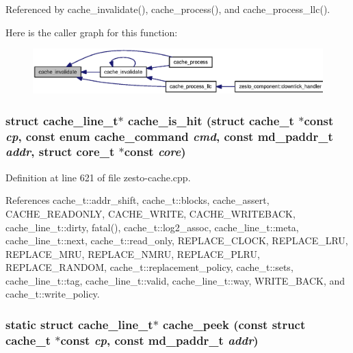 Referenced by cache\_\-invalidate(), cache\_\-process(), and cache\_\-process\_\-llc().

Here is the caller graph for this function:\nopagebreak
\begin{figure}[H]
\begin{center}
\leavevmode
\includegraphics[width=420pt]{zesto-cache_8cpp_3b38a26dd8bf1670d4bf3055d66cfc8d_icgraph}
\end{center}
\end{figure}
\subsubsection[{cache\_\-is\_\-hit}]{\setlength{\rightskip}{0pt plus 5cm}struct {\bf cache\_\-line\_\-t}$\ast$ cache\_\-is\_\-hit (struct {\bf cache\_\-t} $\ast$const  {\em cp}, \/  const enum {\bf cache\_\-command} {\em cmd}, \/  const {\bf md\_\-paddr\_\-t} {\em addr}, \/  struct {\bf core\_\-t} $\ast$const  {\em core})\hspace{0.3cm}{\tt  [read]}}\label{zesto-cache_8cpp_bbba2e5ba6186173122bcf1e35dc56eb}




Definition at line 621 of file zesto-cache.cpp.

References cache\_\-t::addr\_\-shift, cache\_\-t::blocks, cache\_\-assert, CACHE\_\-READONLY, CACHE\_\-WRITE, CACHE\_\-WRITEBACK, cache\_\-line\_\-t::dirty, fatal(), cache\_\-t::log2\_\-assoc, cache\_\-line\_\-t::meta, cache\_\-line\_\-t::next, cache\_\-t::read\_\-only, REPLACE\_\-CLOCK, REPLACE\_\-LRU, REPLACE\_\-MRU, REPLACE\_\-NMRU, REPLACE\_\-PLRU, REPLACE\_\-RANDOM, cache\_\-t::replacement\_\-policy, cache\_\-t::sets, cache\_\-line\_\-t::tag, cache\_\-line\_\-t::valid, cache\_\-line\_\-t::way, WRITE\_\-BACK, and cache\_\-t::write\_\-policy.
\subsubsection[{cache\_\-peek}]{\setlength{\rightskip}{0pt plus 5cm}static struct {\bf cache\_\-line\_\-t}$\ast$ cache\_\-peek (const struct {\bf cache\_\-t} $\ast$const  {\em cp}, \/  const {\bf md\_\-paddr\_\-t} {\em addr})\hspace{0.3cm}{\tt  [static, read]}}\label{zesto-cache_8cpp_32083cc0a79d18fbb1932fca2d15df1e}




